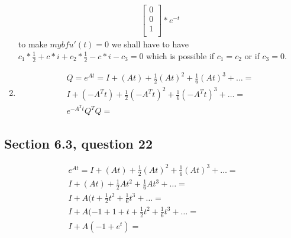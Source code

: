 \documentclass[a4paper,11pt]{article}
\begin{document}
\begin{enumerate}
\begin{align*}
\begin{bmatrix}
0 \\
0 \\
1 \\
\end{bmatrix}
*
e^{-t}
\end{align*}
to make $mybf{u'(t)}=0$ we shall have to have
$c_1*\frac{1}{2}+c*i + c_2*\frac{1}{2}-c*i - c_3 = 0$
which is possible if $c_1=c_2$ or if $c_3=0$.
\item 
\begin{align*}
Q=e^{At}=I+(At)+\frac{1}{2}(At)^2+\frac{1}{6}(At)^3+\dots = \\ 
I+(-A^Tt)+\frac{1}{2}(-A^Tt)^2+\frac{1}{6}(-A^Tt)^3+\dots = \\
e^{-A^Tt}
Q^T Q = 
\end{align*}
\end{enumerate}
\subsection*{Section 6.3, question 22}
\begin{align*}
e^{At}=I+(At)+\frac{1}{2}(At)^2+\frac{1}{6}(At)^3+\dots = \\
I+(At)+\frac{1}{2}At^2+\frac{1}{6}At^3+\dots = \\
I+ A (t + \frac{1}{2}t^2+\frac{1}{6}t^3+\dots = \\
I+ A (-1 + 1 + t + \frac{1}{2}t^2+\frac{1}{6}t^3+\dots = \\
I+ A (-1 + e^t) = \\
\end{align*}
\end{document}
